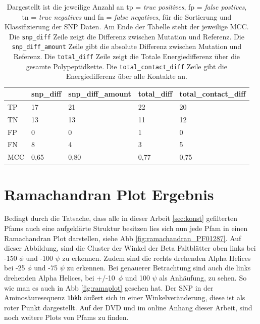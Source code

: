 \begin{table}[]
    \centering
    \caption{Dargestellt ist die jeweilige Anzahl an tp = \emph{true positives}, fp = \emph{false postives}, tn = \emph{true negatives} und fn = \emph{false negatives}, für die Sortierung und Klassifizierung der \ac{SNP} Daten. Am Ende der Tabelle steht der jeweilige \acf{MCC}. Die \texttt{snp\_diff} Zeile zeigt die Differenz zwischen Mutation und Referenz. Die \texttt{snp\_diff\_amount} Zeile gibt die absolute Differenz zwischen Mutation und Referenz. Die \texttt{total\_diff} Zeile zeigt die Totale Energiedifferenz über die gesamte Polypeptidkette. Die \texttt{total\_contact\_diff} Zeile gibt die Energiedifferenz über alle Kontakte an.}
    \label{tab:mcc_table}
    \begin{tabular}{l|l|l|l|l|}
        \cline{2-5}
         & snp\_diff & snp\_diff\_amount & total\_diff & total\_contact\_diff \\ \hline
        \multicolumn{1}{|l|}{TP} & 17 & 21 & 22 & 20 \\ \hline
        \multicolumn{1}{|l|}{TN} & 13 & 13 & 11 & 12 \\ \hline
        \multicolumn{1}{|l|}{FP} & 0 & 0 & 1 & 0 \\ \hline
        \multicolumn{1}{|l|}{FN} & 8 & 4 & 3 & 5 \\ \hline
        \multicolumn{1}{|l|}{MCC} & \cellcolor[HTML]{FFFFC7}0,65 & \cellcolor[HTML]{9AFF99}0,80 & \cellcolor[HTML]{CBFFCB}0,77 & \cellcolor[HTML]{E2FFE2}0,75 \\ \hline
    \end{tabular}
\end{table}



\newpage
\section{Ramachandran Plot Ergebnis}
Bedingt durch die Tatsache, dass alle in dieser Arbeit \ref{sec:konst} gefilterten \ac{Pfams} auch eine aufgeklärte Struktur besitzen lies sich nun jede \ac{Pfam} in einen Ramachandran Plot darstellen, siehe \ac{Abb} \ref{fig:ramachandran_PF01287}. Auf dieser Abbildung, sind die Cluster der Winkel der Beta Faltblätter oben links bei -150 $\phi$ und -100 $\psi$ zu erkennen. Zudem sind die rechts drehenden Alpha Helices bei -25 $\phi$ und -75 $\psi$ zu erkennen. Bei genauerer Betrachtung sind auch die links drehenden Alpha Helices, bei +/-10\ $\phi$ und 100 $\psi$ als Anhäufung, zu sehen. So wie man es auch in \ac{Abb} \ref{fig:ramaplot} gesehen hat. Der \ac{SNP} in der Aminosäuresequenz \texttt{1bkb} äußert sich in einer Winkelveränderung, diese ist als roter Punkt dargestellt. Auf der DVD und im online Anhang dieser Arbeit, sind noch weitere Plots von \ac{Pfams} zu finden.

